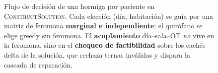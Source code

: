 \begin{figure}[H]

\caption{Flujo de decisión de una hormiga por paciente en \textsc{ConstructSolution}.
Cada elección (día, habitación) se guía por una matriz de feromona
\textcolor{colTau}{\textbf{marginal e independiente}}; el quirófano se elige
\textcolor{colGreedy}{greedy sin feromona}. El \textbf{acoplamiento}
día--sala--OT \emph{no} vive en la feromona, sino en el
\textcolor{colFeas}{\textbf{chequeo de factibilidad}} sobre los cachés delta de
la solución, que rechaza ternas inválidas y dispara la cascada de reparación.}
\label{fig:decision-flow}
\end{figure}



